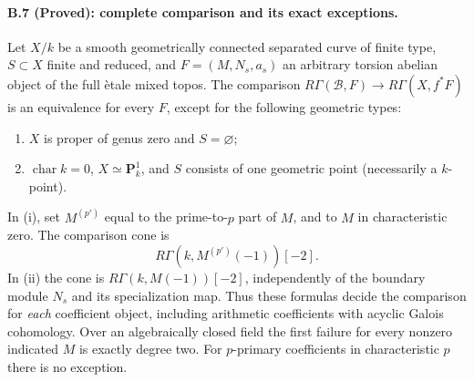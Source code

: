 \paragraph{B.7 (Proved): complete comparison and its exact exceptions.}\label{B7}
Let $X/k$ be a smooth geometrically connected separated curve of
finite type, $S\subset X$ finite and reduced, and $F=(M,N_s,a_s)$
an arbitrary torsion abelian object of the full \`etale mixed
topos. The comparison $R\Gamma(\mathcal B,F)\to R\Gamma(X,f^*F)$
is an equivalence for every $F$, except for the following geometric
types:
\begin{enumerate}[label=(\roman*)]
\item $X$ is proper of genus zero and $S=\varnothing$;
\item $\operatorname{char}k=0$, $X\simeq\mathbf P^1_k$, and
$S$ consists of one geometric point (necessarily a $k$-point).
\end{enumerate}
In (i), set $M^{(p')}$ equal to the prime-to-$p$ part of $M$,
and to $M$ in characteristic zero. The comparison cone is
\begin{equation}\label{eq:B-genuszero}
 R\Gamma(k,M^{(p')}(-1))[-2].
\end{equation}
In (ii) the cone is $R\Gamma(k,M(-1))[-2]$, independently of
the boundary module $N_s$ and its specialization map. Thus these
formulas decide the comparison for \emph{each} coefficient object,
including arithmetic coefficients with acyclic Galois cohomology.
Over an algebraically closed field the first failure for every
nonzero indicated $M$ is exactly degree two. For $p$-primary
coefficients in characteristic $p$ there is no exception.

